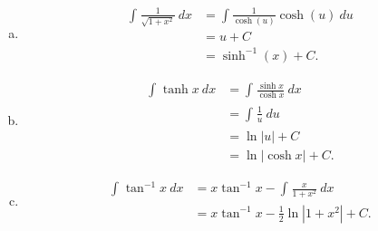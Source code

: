 \documentclass[10pt]{mypackage}
\begin{document}
\begin{enumerate}[(a)]
  \item 
    \begin{align*}
    \int_{}^{} \frac{1}{\sqrt{1+x^2}}\:dx &= \int\frac{1}{\cosh(u)}\cosh(u)\:du \tag*{$x = \sinh(u)$}\\
                                          &= u + C\\
                                          &= \sinh^{-1}\left(x\right) + C.
    \end{align*}
  \item 
    \begin{align*}
      \int_{}^{} \tanh x\:dx &= \int_{}^{} \frac{\sinh x}{\cosh x}\:dx\\
                             &= \int_{}^{} \frac{1}{u}\:du\tag*{$u = \cosh x$}\\
                             &= \ln\left\vert u \right\vert + C\\
                             &= \ln\left\vert \cosh x \right\vert + C.
    \end{align*}
  \item 
    \begin{align*}
      \int_{}^{} \tan^{-1}x\:dx &= x\tan^{-1}x - \int_{}^{} \frac{x}{1+x^2}\:dx\tag*{Integration by parts.}\\
                                &= x\tan^{-1}x - \frac{1}{2}\ln|1 + x^2| + C.\tag*{$u$-substitution implicig}
    \end{align*}
\end{enumerate}
\end{document}
